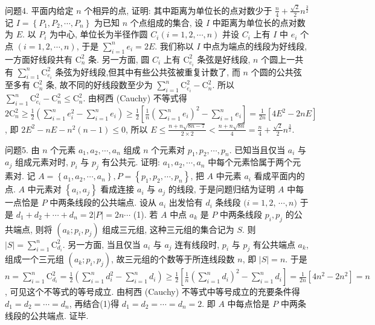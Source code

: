 问题4. 平面内给定 $n$ 个相异的点, 证明: 其中距离为单位长的点对数少于 $\frac{n}{4}+ \frac{\sqrt{2}}{2} n^{\frac{3}{2}}$
记 $I=\left\{P_1, P_2, \cdots, P_n\right\}$ 为已知 $n$ 个点组成的集合, 设 $I$ 中距离为单位长的点对数为 $E$. 以 $P_i$ 为中心, 单位长为半径作圆 $C_i(i=1,2, \cdots, n)$ 并设 $C_i$ 上有 $I$ 中 $e_i$ 个点 $(i=1,2, \cdots, n)$, 于是 $\sum_{i=1}^n e_i=2 E$. 我们称以 $I$ 中点为端点的线段为好线段,一方面好线段共有 $\mathrm{C}_n^2$ 条.
另一方面, 圆 $C_i$ 上有 $\mathrm{C}_{e_i}^2$ 条弦是好线段, $n$ 个圆上一共有 $\sum_{i=1}^n \mathrm{C}_{e_i}^2$ 条弦为好线段,但其中有些公共弦被重复计数了, 而 $n$ 个圆的公共弦至多有 $\mathrm{C}_n^2$ 条, 故不同的好线段数至少为 $\sum_{i=1}^n \mathrm{C}_{e_i}^2-\mathrm{C}_n^2$. 所以 $\sum_{i=1}^n \mathrm{C}_{e_i}^2-\mathrm{C}_n^2 \leqslant \mathrm{C}_n^2$. 由柯西 (Cauchy) 不等式得 $2 \mathrm{C}_n^2 \geqslant \frac{1}{2}\left(\sum_{i=1}^n e_i^2-\sum_{i=1}^n e_i\right) \geqslant \frac{1}{2}\left[\frac{1}{n}\left(\sum_{i=1}^n e_i\right)^2-\sum_{i=1}^n e_i\right]=\frac{1}{2 n}\left[4 E^2-2 n E\right]$, 即 $2 E^2-n E-n^2(n-1) \leqslant 0$, 所以 $E \leqslant \frac{n+n \sqrt{8 n-7}}{2 \times 2}<\frac{n+n \sqrt{8 n}}{4}=\frac{n}{4}+\frac{\sqrt{2}}{2} n^{\frac{3}{2}}$.



问题5. 由 $n$ 个元素 $a_1, a_2, \cdots, a_n$ 组成 $n$ 个元素对 $p_1, p_2, \cdots, p_n$. 已知当且仅当 $a_i$ 与 $a_j$ 组成元素对时, $p_i$ 与 $p_j$ 有公共元.
证明: $a_1, a_2, \cdots, a_n$ 中每个元素恰属于两个元素对.
记 $A=\left\{a_1, a_2, \cdots, a_n\right\}, P=\left\{p_1, p_2, \cdots, p_n\right\}$, 把 $A$ 中元素 $a_i$ 看成平面内的点.
$A$ 中元素对 $\left\{a_i, a_j\right\}$ 看成连接 $a_i$ 与 $a_j$ 的线段, 于是问题归结为证明 $A$ 中每一点恰是 $P$ 中两条线段的公共端点.
设从 $a_i$ 出发恰有 $d_i$ 条线段 $(i=1,2$, $\cdots, n)$ 于是 $d_1+d_2+\cdots+d_n=2|P|=2 n \cdots$ (1). 
若 $A$ 中点 $a_k$ 是 $P$ 中两条线段 $p_i, p_j$ 的公共端点, 则将 $\left(a_k ; p_i, p_j\right)$ 组成三元组, 这种三元组的集合记为 $S$. 则 $|S|=\sum_{i=1}^n \mathrm{C}_{d_i}^2$. 
另一方面, 当且仅当 $a_i$ 与 $a_j$ 连有线段时, $p_i$ 与 $p_j$ 有公共端点 $a_k$, 组成一个三元组 $\left(a_k ; p_i, p_j\right)$, 故三元组的个数等于所连线段数 $n$, 即 $|S|=n$. 于是 $n=\sum_{i=1}^n \mathrm{C}_{d_i}^2=\frac{1}{2}\left(\sum_{i=1}^n d_i^2-\sum_{i=1}^n d_i\right) \geqslant \frac{1}{2}\left[\frac{1}{n}\left(\sum_{i=1}^n d_i\right)^2-\sum_{i=1}^n d_i\right]= \frac{1}{2 n}\left[4 n^2-2 n^2\right]=n$, 可见这个不等式的等号成立.
由柯西 (Cauchy) 不等式中等号成立的充要条件得 $d_1=d_2=\cdots=d_n$, 再结合(1)得 $d_1=d_2=\cdots=d_n=2$. 即 $A$ 中每点恰是 $P$ 中两条线段的公共端点.
证毕.



